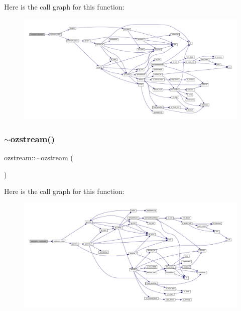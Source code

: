 Here is the call graph for this function\+:
\nopagebreak
\begin{figure}[H]
\begin{center}
\leavevmode
\includegraphics[width=350pt]{classozstream_af30abfcf07fef0000c7fd3e4ab89eb85_cgraph}
\end{center}
\end{figure}
\mbox{\label{classozstream_a56dd28c53840cceea83239d640cae78e}} 
\subsubsection{\texorpdfstring{$\sim$ozstream()}{~ozstream()}}
{\footnotesize\ttfamily ozstream\+::$\sim$ozstream (\begin{DoxyParamCaption}{ }\end{DoxyParamCaption})\hspace{0.3cm}{\ttfamily [inline]}}

Here is the call graph for this function\+:
\nopagebreak
\begin{figure}[H]
\begin{center}
\leavevmode
\includegraphics[width=350pt]{classozstream_a56dd28c53840cceea83239d640cae78e_cgraph}
\end{center}
\end{figure}


